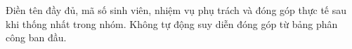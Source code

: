 Điền tên đầy đủ, mã số sinh viên, nhiệm vụ phụ trách và đóng góp thực tế sau khi thống nhất trong nhóm. Không tự động suy diễn đóng góp từ bảng phân công ban đầu.
